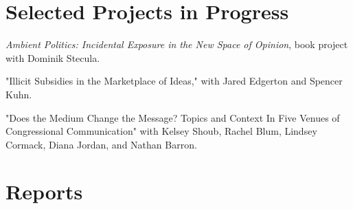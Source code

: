 \documentclass[letterpaper]{article}
\renewenvironment{itemize}{
  \begin{list}{}{
    \setlength{\leftmargin}{1.5em}
  }
}{
  \end{list}
}
\begin{document}
\begin{itemize}


\end{itemize}

\section*{Selected Projects in Progress}

\begin{itemize}

\item \textit{Ambient Politics: Incidental Exposure in the New Space of Opinion}, book project with Dominik Stecula.

\item "Illicit Subsidies in the Marketplace of Ideas," with Jared Edgerton and Spencer Kuhn.

\item "Does the Medium Change the Message? Topics and Context In Five Venues of Congressional Communication" with Kelsey Shoub, Rachel Blum, Lindsey Cormack, Diana Jordan, and Nathan Barron.



\end{itemize}

\section*{Reports}
\end{document}
